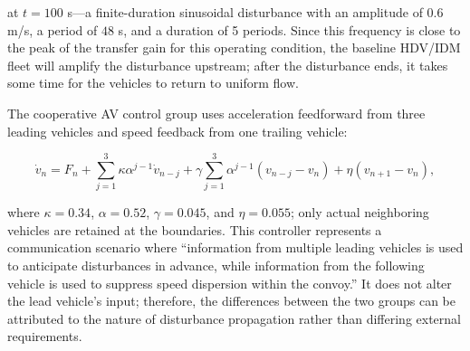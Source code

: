 \documentclass[11pt,a4paper,openany]{book}
\numberwithin{equation}{chapter}
\numberwithin{figure}{chapter}
\numberwithin{table}{chapter}
\begin{document}
at $t=100$ s—a finite-duration sinusoidal disturbance with an amplitude of $0.6$ m/s, a period of $48$ s, and a duration of 5 periods. Since this frequency is close to the peak of the transfer gain for this operating condition, the baseline HDV/IDM fleet will amplify the disturbance upstream; after the disturbance ends, it takes some time for the vehicles to return to uniform flow.




The cooperative AV control group uses acceleration feedforward from three leading vehicles and speed feedback from one trailing vehicle:

\begin{equation}
\dot v_n
=F_n+\sum_{j=1}^{3}\kappa\alpha^{j-1}\dot v_{n-j}
+\gamma\sum_{j=1}^{3}\alpha^{j-1}(v_{n-j}-v_n)
+\eta(v_{n+1}-v_n),
\label{eq:application-cooperative-av}
\end{equation}

where $\kappa=0.34$, $\alpha=0.52$, $\gamma=0.045$, and $\eta=0.055$; only actual neighboring vehicles are retained at the boundaries. This controller represents a communication scenario where “information from multiple leading vehicles is used to anticipate disturbances in advance, while information from the following vehicle is used to suppress speed dispersion within the convoy.” It does not alter the lead vehicle’s input; therefore, the differences between the two groups can be attributed to the nature of disturbance propagation rather than differing external requirements.
\end{document}
